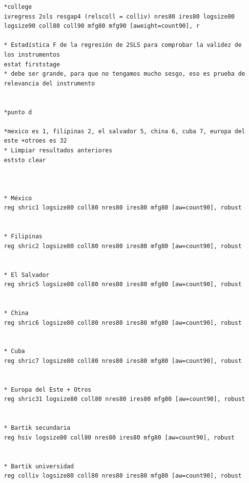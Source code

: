 \documentclass[a4paper, answers, addpoints, 11pt]{exam}
\begin{document}
\begin{verbatim}
*college
ivregress 2sls resgap4 (relscoll = colliv) nres80 ires80 logsize80 logsize90 coll80 coll90 mfg80 mfg90 [aweight=count90], r

* Estadística F de la regresión de 2SLS para comprobar la validez de los instrumentos
estat firststage
* debe ser grande, para que no tengamos mucho sesgo, eso es prueba de relevancia del instrumento


*punto d

*mexico es 1, filipinas 2, el salvador 5, china 6, cuba 7, europa del este +otroes es 32
* Limpiar resultados anteriores
eststo clear



* México
reg shric1 logsize80 coll80 nres80 ires80 mfg80 [aw=count90], robust


* Filipinas
reg shric2 logsize80 coll80 nres80 ires80 mfg80 [aw=count90], robust


* El Salvador
reg shric5 logsize80 coll80 nres80 ires80 mfg80 [aw=count90], robust


* China
reg shric6 logsize80 coll80 nres80 ires80 mfg80 [aw=count90], robust


* Cuba
reg shric7 logsize80 coll80 nres80 ires80 mfg80 [aw=count90], robust


* Europa del Este + Otros
reg shric31 logsize80 coll80 nres80 ires80 mfg80 [aw=count90], robust


* Bartik secundaria
reg hsiv logsize80 coll80 nres80 ires80 mfg80 [aw=count90], robust


* Bartik universidad
reg colliv logsize80 coll80 nres80 ires80 mfg80 [aw=count90], robust

\end{verbatim}
\end{document}
